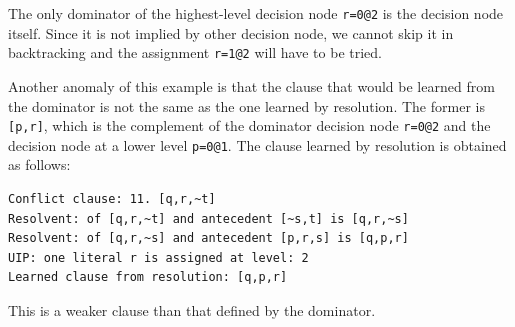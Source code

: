 \documentclass[11pt]{report}
\begin{document}
The only dominator of the highest-level decision node \verb+r=0@2+ is
the decision node itself. Since it is not implied by other decision
node, we cannot skip it in backtracking and the assignment \verb+r=1@2+
will have to be tried.

Another anomaly of this example is that the clause that would be learned
from the dominator is not the same as the one learned by resolution. The
former is \verb+[p,r]+, which is the complement of the dominator
decision node \verb+r=0@2+ and the decision node at a lower level
\verb+p=0@1+. The clause learned by resolution is obtained as follows:

\begin{verbatim}
Conflict clause: 11. [q,r,~t]
Resolvent: of [q,r,~t] and antecedent [~s,t] is [q,r,~s]
Resolvent: of [q,r,~s] and antecedent [p,r,s] is [q,p,r]
UIP: one literal r is assigned at level: 2
Learned clause from resolution: [q,p,r]
\end{verbatim}

This is a weaker clause than that defined by the dominator.



\end{document}
